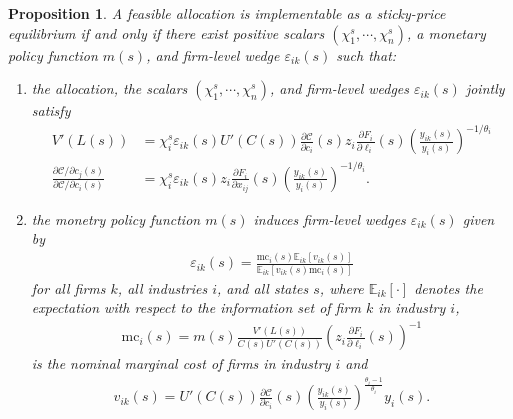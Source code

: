 \documentclass[12pt]{article}
\newtheorem{proposition}{Proposition}
\numberwithin{equation}{section}
\begin{document}
\begin{proposition}
    A feasible allocation is implementable as a sticky-price equilibrium if and only if there exist positive scalars $(\chi_1^s, \cdots, \chi_n^s)$, a monetary policy function $m(s)$, and firm-level wedge $\varepsilon_{ik}(s)$ such that:
    \begin{enumerate}
        \item the allocation, the scalars $(\chi_1^s, \cdots, \chi_n^s)$, and firm-level wedges $\varepsilon_{ik}(s)$ jointly satisfy
        \begin{align}
            V'(L(s)) &= \chi_i^s \varepsilon_{ik}(s) U'(C(s))\frac{\partial \mathcal{C}}{\partial c_i}(s) z_i\frac{\partial F_i}{\partial \ell_i}(s) \left(\frac{y_{ik}(s)}{y_i(s)}\right)^{-1/\theta_i}\label{eq:sticky_eqm_goods_labour} \\
            \frac{\partial \mathcal{C} / \partial c_j(s)}{\partial \mathcal{C} / \partial c_i(s)} &= \chi_i^s \varepsilon_{ik}(s) z_i\frac{\partial F_i}{\partial x_{ij}}(s) \left(\frac{y_{ik}(s)}{y_i(s)}\right)^{-1/\theta_i}. 
            \label{eq:sticky_eqm_goods_subs}
        \end{align}

        \item the monetry policy function $m(s)$ induces firm-level wedges $\varepsilon_{ik}(s)$ given by
        \begin{align}\label{eq:sticky_firm_wedge}
            \varepsilon_{ik}(s) = \frac{\text{mc}_i(s)\mathbb{E}_{ik}[v_{ik}(s)]}{\mathbb{E}_{ik}[v_{ik}(s) \text{mc}_i(s)]}
        \end{align}
        for all firms $k$, all industries $i$, and all states $s$, where $\mathbb{E}_{ik}[\cdot]$ denotes the expectation with respect to the information set of firm $k$ in industry $i$,
        \begin{align}\label{eq:sticky_eqm_mc_mp}
            \text{mc}_i(s) = m(s)\frac{V'(L(s))}{C(s) U'(C(s))} \left(z_i \frac{\partial F_i}{\partial \ell_{i}}(s) \right)^{-1}
        \end{align}
        is the nominal marginal cost of firms in industry $i$ and 
        \begin{align*}
            v_{ik}(s) = U'(C(s)) \frac{\partial \mathcal{C}}{\partial c_i}(s) \left(\frac{y_{ik}(s)}{y_i(s)}\right)^{\frac{\theta_i-1}{\theta_i}} y_i(s).
        \end{align*}
    \end{enumerate}
    
\end{proposition}
\end{document}
